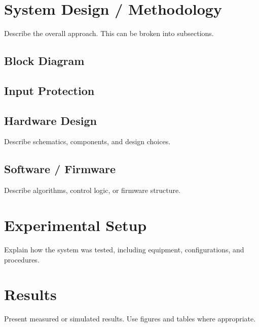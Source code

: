 \documentclass[11pt]{article}
\begin{document}
\section{System Design / Methodology}
Describe the overall approach. This can be broken into subsections.

\subsection{Block Diagram} %


\subsection{Input Protection}
\noindent 
 



\subsection{Hardware Design}
Describe schematics, components, and design choices.

\subsection{Software / Firmware}
Describe algorithms, control logic, or firmware structure.

\section{Experimental Setup}
Explain how the system was tested, including equipment, configurations, and procedures.

\section{Results}
Present measured or simulated results. Use figures and tables where appropriate.
\end{document}
